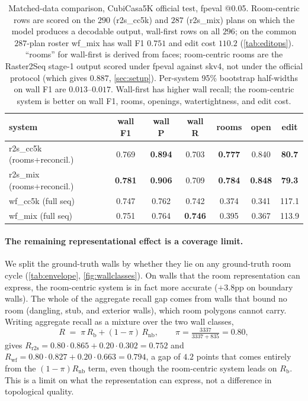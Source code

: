 \documentclass{article}
\newcommand{\tbf}[1]{\textbf{#1}}
\begin{document}
\begin{table}[t]
\centering
\caption{Matched-data comparison, CubiCasa5K official test, fpeval @0.05.
Room-centric rows are scored on the $290$ (r2s\_cc5k) and $287$ (r2s\_mix)
plans on which the model produces a decodable output, wall-first rows on all
$296$; on the common $287$-plan roster wf\_mix has wall F1 $0.751$ and edit
cost $110.2$ (\cref{tab:editops}). ``rooms'' for wall-first is derived from
faces; room-centric rooms are the Raster2Seq stage-1 output scored under fpeval
against skv4, not under the official protocol (which gives $0.887$,
\cref{sec:setup}). Per-system 95\% bootstrap half-widths on wall F1 are
$0.013$--$0.017$. Wall-first has higher wall recall; the room-centric system is
better on wall F1, rooms, openings, watertightness, and edit cost.}
\label{tab:main}
\small
\begin{tabular}{lcccccc}
\toprule
system & wall F1 & wall P & wall R & rooms & open & edit \\
\midrule
r2s\_cc5k (rooms+reconcil.)  & 0.769 & \tbf{0.894} & 0.703 & \tbf{0.777} & 0.840 & \tbf{80.7} \\
r2s\_mix  (rooms+reconcil.)  & \tbf{0.781} & \tbf{0.906} & 0.709 & \tbf{0.784} & \tbf{0.848} & \tbf{79.3} \\
wf\_cc5k  (full seq)     & 0.747 & 0.762 & 0.742 & 0.374 & 0.341 & 117.1 \\
wf\_mix   (full seq)     & 0.751 & 0.764 & \tbf{0.746} & 0.395 & 0.367 & 113.9 \\
\bottomrule
\end{tabular}
\end{table}

\paragraph{The remaining representational effect is a coverage limit.}
We split the ground-truth walls by whether they lie on any ground-truth room
cycle (\cref{tab:envelope}, \cref{fig:wallclasses}). On walls that the room
representation can express, the room-centric system is in fact more accurate
($+3.8$pp on boundary walls). The whole of the aggregate recall gap comes from
walls that bound no room (dangling, stub, and exterior walls), which room
polygons cannot carry. Writing aggregate recall as a mixture over the two wall
classes,
\begin{equation}
  R \;=\; \pi\,R_{\mathrm{b}} + (1-\pi)\,R_{\mathrm{nb}},
  \qquad \pi=\tfrac{3337}{3337+835}=0.80,
  \label{eq:envelope}
\end{equation}
gives $R_{\mathrm{r2s}}=0.80\cdot0.865+0.20\cdot0.302=0.752$ and
$R_{\mathrm{wf}}=0.80\cdot0.827+0.20\cdot0.663=0.794$, a gap of $4.2$ points
that comes entirely from the $(1-\pi)R_{\mathrm{nb}}$ term, even though the
room-centric system leads on $R_{\mathrm{b}}$. This is a limit on what the
representation can express, not a difference in topological quality.
\end{document}
